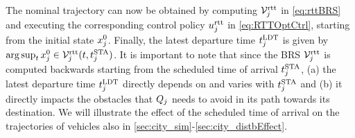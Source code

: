 The nominal trajectory can now be obtained by computing $\mathcal{V}_j^\text{rtt}$ in \eqref{eq:rttBRS} and executing the corresponding control policy $u_j^\text{rtt}$ in \eqref{eq:RTTOptCtrl}, starting from the initial state $x^0_j$. Finally, the latest departure time $t^\text{LDT}_j$ is given by $\arg \sup_t x^0_j \in \mathcal{V}_j^\text{rtt}(t, t^\text{STA}_j)$. It is important to note that since the BRS $\mathcal{V}_j^\text{rtt}$ is computed backwards starting from the scheduled time of arrival $t^\text{STA}_j$, (a) the latest departure time $t^\text{LDT}_j$ directly depends on and varies with $t^\text{STA}_j$ and (b) it directly impacts the obstacles that $Q_j$ needs to avoid in its path towards its destination. We will illustrate the effect of the scheduled time of arrival on the trajectories of vehicles also in \ref{sec:city_sim}-\ref{sec:city_distbEffect}.

